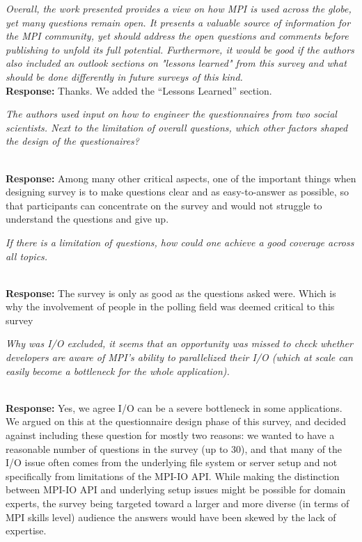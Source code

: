 \documentclass[11pt]{article}
\newcommand{\response}[2]{{\vspace{5mm}\noindent{\bf Comment:} \em #1}\\%
  {\bf Response:} #2}
\newcommand{\iresponse}[2]{{\item \em #1}\\%
  {\bf Response:} #2}
\begin{document}
\response{Overall, the work presented provides a view on how MPI is
  used across the globe, yet many questions remain open. It presents a
  valuable source of information for the MPI community, yet should
  address the open questions and comments before publishing to unfold
  its full potential. Furthermore, it would be good if the authors
  also included an outlook sections on "lessons learned" from this
  survey and what should be done differently in future surveys of this
  kind.}
{
Thanks. We added the ``Lessons Learned'' section.
}

\begin{enumerate}
\iresponse{The authors used input on how to engineer the questionnaires
  from two social scientists. Next to the limitation of overall
  questions, which other factors shaped the design of the
  questionaires?}
{Among many other critical aspects, one of the important things when designing survey is to make
  questions clear and as easy-to-answer as possible, so that participants can
  concentrate on the survey and would not struggle to understand the questions and give up.}

\iresponse{If there is a limitation of questions, how could one
  achieve a good coverage across all topics.}
{The survey is only as good as the questions asked were. Which is why the involvement of
people in the polling field was deemed critical to this survey}

\iresponse{Why was I/O excluded, it seems that an opportunity was
  missed to check whether developers are aware of MPI's ability to
  parallelized their I/O (which at scale can easily become a
  bottleneck for the whole application).}
{
Yes, we agree I/O can be a severe bottleneck in some applications. We
argued on this at the questionnaire design phase of this survey, and decided
against including these question for mostly two reasons: we wanted to have
a reasonable number of questions in the survey (up to 30), and
that many of the I/O issue often comes from
the underlying file system or server setup and not specifically from limitations of the MPI-IO API.
While making the distinction between MPI-IO API and underlying setup issues might be possible for
domain experts, the survey being targeted toward a larger and more diverse (in terms of
MPI skills level) audience the answers would have been skewed by the lack of expertise.
}
\begin{comment}

We thought it is very
difficult for some MPI users to distinguish whether the I/O issue comes
from the underlying file system or MPI-IO itself. This can be true
when MPI users are domain experts but they lack system
knowledge. Hence, 
we decided not to have MPI-IO related questions.
\end{comment}


\end{enumerate}
\end{document}
